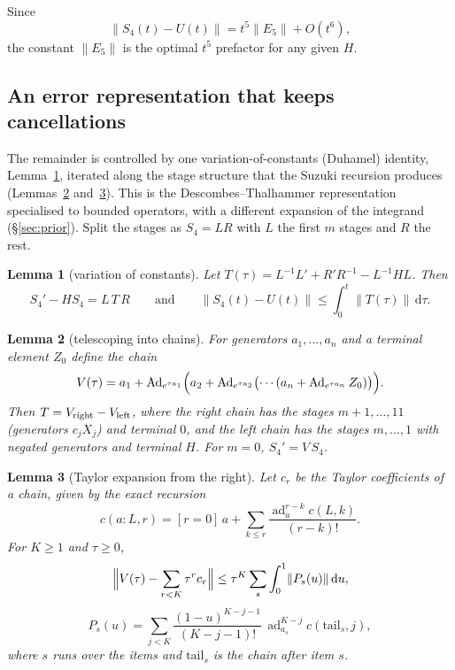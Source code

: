 \documentclass[11pt]{article}
\newcommand{\ad}{\operatorname{ad}}
\newcommand{\Ad}{\operatorname{Ad}}
\newcommand{\norm}[1]{\lVert #1\rVert}
\newcommand{\dd}{\,\mathrm{d}}
\theoremstyle{plain}
\newtheorem{lemma}{Lemma}
\theoremstyle{definition}
\theoremstyle{remark}
\begin{document}
Since
\[
\norm{S_4(t)-U(t)}=t^5\norm{E_5}+O(t^6),
\]
the constant $\norm{E_5}$ is the optimal $t^5$ prefactor for any given $H$.

\subsection{An error representation that keeps cancellations}

The remainder is controlled by one variation-of-constants (Duhamel) identity, Lemma~\ref{lem:voc},
iterated along the stage structure that the Suzuki recursion produces (Lemmas~\ref{lem:tele} and~\ref{lem:taylor}). This is the Descombes--Thalhammer
representation~\cite{DescombesThalhammer2010} specialised to bounded operators, with a different
expansion of the integrand (\S\ref{sec:prior}). Split the stages as $S_4=LR$ with $L$ the first $m$ stages and $R$ the rest.

\begin{lemma}[variation of constants]\label{lem:voc}
Let $T(\tau)=L^{-1}L'+R'R^{-1}-L^{-1}HL$. Then
\[
S_4'-HS_4=L\,T\,R\qquad\text{and}\qquad \norm{S_4(t)-U(t)}\le\int_0^t\norm{T(\tau)}\dd\tau .
\]
\end{lemma}

\begin{lemma}[telescoping into chains]\label{lem:tele}
For generators $a_1,\dots,a_n$ and a terminal element $Z_0$ define the \emph{chain}
\[
V(\tau)=a_1+\Ad_{e^{\tau a_1}}\Bigl(a_2+\Ad_{e^{\tau a_2}}\bigl(\cdots(a_n+\Ad_{e^{\tau a_n}}Z_0)\bigr)\Bigr).
\]
Then $T=V_{\rm right}-V_{\rm left}$, where the right chain has the stages $m+1,\dots,11$ (generators
$c_jX_j$) and terminal $0$, and the left chain has the stages $m,\dots,1$ with negated generators and
terminal $H$. For $m=0$, $S_4'=V\,S_4$.
\end{lemma}

\begin{lemma}[Taylor expansion from the right]\label{lem:taylor}
Let $c_r$ be the Taylor coefficients of a chain, given by the exact recursion
\[
c(a{:}L,r)=[r{=}0]\,a+\sum_{k\le r}\frac{\ad_a^{r-k}c(L,k)}{(r-k)!}.
\]
For $K\ge1$ and $\tau\ge0$,
\[
\Bigl\lVert V(\tau)-\sum_{r<K}\tau^rc_r\Bigr\rVert\le\tau^K\sum_{s}\int_0^1\norm{P_s(u)}\dd u,
\]
\[
P_s(u)=\sum_{j<K}\frac{(1-u)^{K-j-1}}{(K-j-1)!}\,\ad_{a_s}^{K-j}c(\mathrm{tail}_s,j),
\]
where $s$ runs over the items and $\mathrm{tail}_s$ is the chain after item $s$.
\end{lemma}
\end{document}
